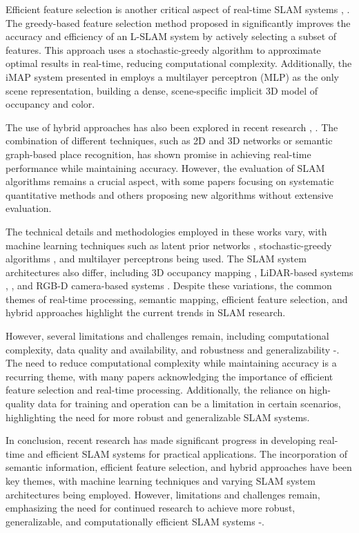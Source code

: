 \documentclass[conference]{IEEEtran}
\begin{document}
Efficient feature selection is another critical aspect of real-time SLAM systems \cite{b5}, \cite{b6}. The greedy-based feature selection method proposed in \cite{b5} significantly improves the accuracy and efficiency of an L-SLAM system by actively selecting a subset of features. This approach uses a stochastic-greedy algorithm to approximate optimal results in real-time, reducing computational complexity. Additionally, the iMAP system presented in \cite{b6} employs a multilayer perceptron (MLP) as the only scene representation, building a dense, scene-specific implicit 3D model of occupancy and color.

The use of hybrid approaches has also been explored in recent research \cite{b3}, \cite{b4}. The combination of different techniques, such as 2D and 3D networks or semantic graph-based place recognition, has shown promise in achieving real-time performance while maintaining accuracy. However, the evaluation of SLAM algorithms remains a crucial aspect, with some papers focusing on systematic quantitative methods \cite{b2} and others proposing new algorithms without extensive evaluation.

The technical details and methodologies employed in these works vary, with machine learning techniques such as latent prior networks \cite{b3}, stochastic-greedy algorithms \cite{b5}, and multilayer perceptrons \cite{b6} being used. The SLAM system architectures also differ, including 3D occupancy mapping \cite{b3}, LiDAR-based systems \cite{b4}, \cite{b5}, and RGB-D camera-based systems \cite{b6}. Despite these variations, the common themes of real-time processing, semantic mapping, efficient feature selection, and hybrid approaches highlight the current trends in SLAM research.

However, several limitations and challenges remain, including computational complexity, data quality and availability, and robustness and generalizability \cite{b1}-\cite{b6}. The need to reduce computational complexity while maintaining accuracy is a recurring theme, with many papers acknowledging the importance of efficient feature selection and real-time processing. Additionally, the reliance on high-quality data for training and operation can be a limitation in certain scenarios, highlighting the need for more robust and generalizable SLAM systems.

In conclusion, recent research has made significant progress in developing real-time and efficient SLAM systems for practical applications. The incorporation of semantic information, efficient feature selection, and hybrid approaches have been key themes, with machine learning techniques and varying SLAM system architectures being employed. However, limitations and challenges remain, emphasizing the need for continued research to achieve more robust, generalizable, and computationally efficient SLAM systems \cite{b1}-\cite{b6}.
\end{document}

